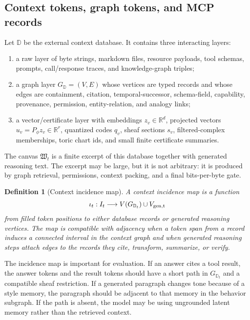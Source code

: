 \documentclass[11pt]{article}
\newtheorem{definition}[theorem]{Definition}
\newcommand{\RR}{\mathbb{R}}
\numberwithin{equation}{section}
\begin{document}
\subsection{Context tokens, graph tokens, and MCP records}
Let $\mathbb{D}$ be the external context database. It contains three interacting layers:
\begin{enumerate}
\item a raw layer of byte strings, markdown files, resource payloads, tool schemas, prompts, call/response traces, and knowledge-graph triples;
\item a graph layer $G_{\mathbb{D}}=(V,E)$ whose vertices are typed records and whose edges are containment, citation, temporal-successor, schema-field, capability, provenance, permission, entity-relation, and analogy links;
\item a vector/certificate layer with embeddings $z_v\in\RR^d$, projected vectors $u_v=P_\phi z_v\in\RR^r$, quantized codes $q_v$, sheaf sections $s_v$, filtered-complex memberships, toric chart ids, and small finite certificate summaries.
\end{enumerate}
The canvas $\mathfrak{W}_t$ is a finite excerpt of this database together with generated reasoning text. The excerpt may be large, but it is not arbitrary: it is produced by graph retrieval, permissions, context packing, and a final bits-per-byte gate.

\begin{definition}[Context incidence map]
A context incidence map is a function
\begin{equation}
\iota_t:I_t\longrightarrow V(G_{\mathbb{D}_t})\cup V_{\rm gen,t}
\end{equation}
from filled token positions to either database records or generated reasoning vertices. The map is compatible with adjacency when a token span from a record induces a connected interval in the context graph and when generated reasoning steps attach edges to the records they cite, transform, summarize, or verify.
\end{definition}

The incidence map is important for evaluation. If an answer cites a tool result, the answer tokens and the result tokens should have a short path in $G_{\mathbb{D}_t}$ and a compatible sheaf restriction. If a generated paragraph changes tone because of a style memory, the paragraph should be adjacent to that memory in the behavior subgraph. If the path is absent, the model may be using ungrounded latent memory rather than the retrieved context.
\end{document}
